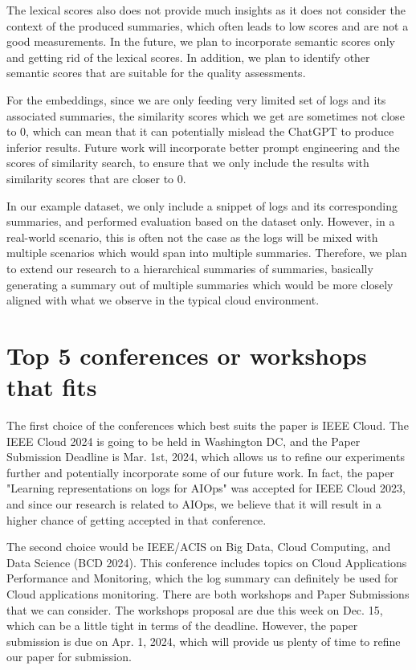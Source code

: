 \documentclass[conference]{IEEEtran}
\begin{document}
The lexical scores also does not provide much insights as it does not consider the context of the produced summaries, which often leads to low scores and are not a good measurements. In the future, we plan to incorporate semantic scores only and getting rid of the lexical scores. In addition, we plan to identify other semantic scores that are suitable for the quality assessments. 

For the embeddings, since we are only feeding very limited set of logs and its associated summaries, the similarity scores which we get are sometimes not close to 0, which can mean that it can potentially mislead the ChatGPT to produce inferior results. Future work will incorporate better prompt engineering and the scores of similarity search, to ensure that we only include the results with similarity scores that are closer to 0.

In our example dataset, we only include a snippet of logs and its corresponding summaries, and performed evaluation based on the dataset only. However, in a real-world scenario, this is often not the case as the logs will be mixed with multiple scenarios which would span into multiple summaries. Therefore, we plan to extend our research to a hierarchical summaries of summaries, basically generating a summary out of multiple summaries which would be more closely aligned with what we observe in the typical cloud environment. 


\section{Top 5 conferences or workshops that fits}
The first choice of the conferences which best suits the paper is IEEE Cloud. The IEEE Cloud 2024 is going to be held in Washington DC, and the Paper Submission Deadline is Mar. 1st, 2024, which allows us to refine our experiments further and potentially incorporate some of our future work. In fact, the paper "Learning representations on logs for AIOps" \cite{gupta2023learning} was accepted for IEEE Cloud 2023, and since our research is related to AIOps, we believe that it will result in a higher chance of getting accepted in that conference.

The second choice would be IEEE/ACIS on Big Data, Cloud Computing, and Data Science (BCD 2024). This conference includes topics on Cloud Applications Performance and Monitoring, which the log summary can definitely be used for Cloud applications monitoring. There are both workshops and Paper Submissions that we can consider. The workshops proposal are due this week on Dec. 15, which can be a little tight in terms of the deadline. However, the paper submission is due on Apr. 1, 2024, which will provide us plenty of time to refine our paper for submission.
\end{document}
